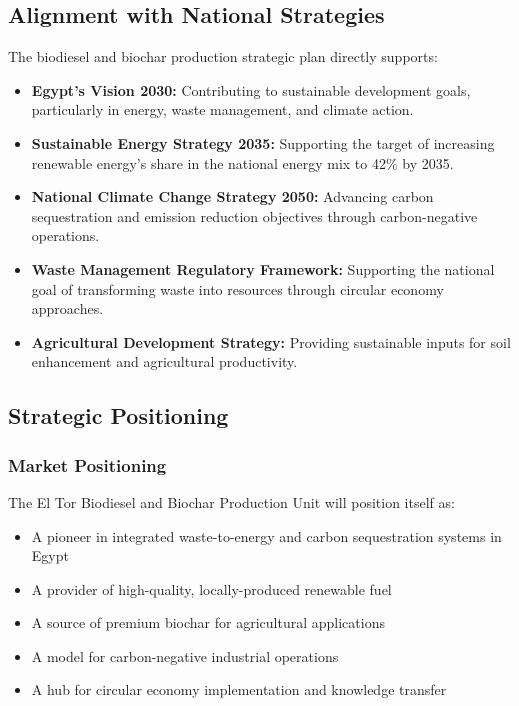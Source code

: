 \subsection{Alignment with National Strategies}

The biodiesel and biochar production strategic plan directly supports:

\begin{itemize}
    \item \textbf{Egypt's Vision 2030:} Contributing to sustainable development goals, particularly in energy, waste management, and climate action.
    
    \item \textbf{Sustainable Energy Strategy 2035:} Supporting the target of increasing renewable energy's share in the national energy mix to 42\% by 2035.
    
    \item \textbf{National Climate Change Strategy 2050:} Advancing carbon sequestration and emission reduction objectives through carbon-negative operations.
    
    \item \textbf{Waste Management Regulatory Framework:} Supporting the national goal of transforming waste into resources through circular economy approaches.
    
    \item \textbf{Agricultural Development Strategy:} Providing sustainable inputs for soil enhancement and agricultural productivity.
\end{itemize}

\subsection{Strategic Positioning}

\subsubsection{Market Positioning}
The El Tor Biodiesel and Biochar Production Unit will position itself as:

\begin{itemize}
    \item A pioneer in integrated waste-to-energy and carbon sequestration systems in Egypt
    \item A provider of high-quality, locally-produced renewable fuel
    \item A source of premium biochar for agricultural applications
    \item A model for carbon-negative industrial operations
    \item A hub for circular economy implementation and knowledge transfer
\end{itemize}

